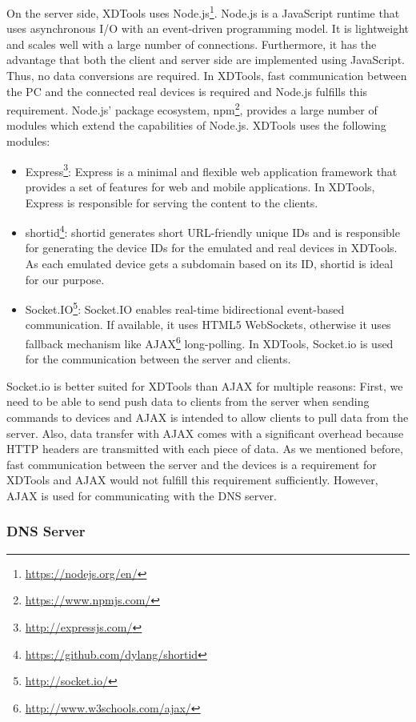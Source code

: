 On the server side, XDTools uses Node.js\footnote{\url{https://nodejs.org/en/}}. Node.js is a JavaScript runtime that uses asynchronous I/O with an event-driven programming model. It is lightweight and scales well with a large number of connections. Furthermore, it has the advantage that both the client and server side are implemented using JavaScript. Thus, no data conversions are required. In XDTools, fast communication between the PC and the connected real devices is required and Node.js fulfills this requirement. Node.js' package ecosystem, npm\footnote{\url{https://www.npmjs.com/}}, provides a large number of modules which extend the capabilities of Node.js. XDTools uses the following modules: 
\begin{itemize}
	\item Express\footnote{\url{http://expressjs.com/}}: Express is a minimal and flexible web application framework that provides a set of features for web and mobile applications. In XDTools, Express is responsible for serving the content to the clients.
	\item shortid\footnote{\url{https://github.com/dylang/shortid}}: shortid generates short URL-friendly unique IDs and is responsible for generating the device IDs for the emulated and real devices in XDTools. As each emulated device gets a subdomain based on its ID, shortid is ideal for our purpose.
	\item Socket.IO\footnote{\url{http://socket.io/}}: Socket.IO enables real-time bidirectional event-based communication. If available, it uses HTML5 WebSockets, otherwise it uses fallback mechanism like AJAX\footnote{\url{http://www.w3schools.com/ajax/}} long-polling. In XDTools, Socket.io is used for the communication between the server and clients.
\end{itemize}

Socket.io is better suited for XDTools than AJAX for multiple reasons: First, we need to be able to send push data to clients from the server when sending commands to devices and AJAX is intended to allow clients to pull data from the server. Also, data transfer with AJAX comes with a significant overhead because HTTP headers are transmitted with each piece of data. As we mentioned before, fast communication between the server and the devices is a requirement for XDTools and AJAX would not fulfill this requirement sufficiently. However, AJAX is used for communicating with the DNS server.

\subsubsection{DNS Server}

